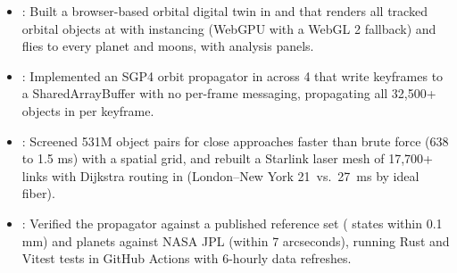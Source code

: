 \begin{itemize}
  \item {}: Built a browser-based orbital digital twin in  and  that renders all  tracked orbital objects at  with instancing (WebGPU with a WebGL 2 fallback) and flies to every planet and  moons, with  analysis panels.
  \item {}: Implemented an SGP4 orbit propagator in  across 4  that write keyframes to a SharedArrayBuffer with no per-frame messaging, propagating all 32,500+ objects in  per keyframe.
  \item {}: Screened 531M object pairs for close approaches \resumeEmphasis{423\ensuremath{\times}} faster than brute force (638 to 1.5 ms) with a spatial grid, and rebuilt a Starlink laser mesh of 17,700+ links with Dijkstra routing in  (London--New York 21~vs.\ 27~ms by ideal fiber).
  \item {}: Verified the propagator against a published reference set ( states within 0.1 mm) and planets against NASA JPL (within 7 arcseconds), running  Rust and Vitest tests in GitHub Actions with 6-hourly data refreshes.
\end{itemize}
